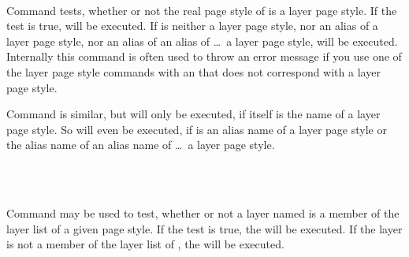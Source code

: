 \begin{Declaration}
  \\
\end{Declaration}
%
%
Command  tests, whether or not the real page
style of  is a layer page style. If the test is true,
 will be executed. If  is neither a
layer page style, nor an alias of a layer page style, nor an alias of an alias
of \dots\ a layer page style,  will be executed. Internally
this command is often used to throw an error message if you use one of the
layer page style commands with an  that does not
correspond with a layer page style.

Command  is similar, but 
will only be executed, if  itself is the name of a
layer page style. So  will even be executed, if  is an alias name of a layer page style or the alias name of an
alias name of \dots\ a layer page style.%
%
%

\begin{Declaration}
  \\
  \\
\end{Declaration}
%
%
%
Command  may be used to test, whether or not a layer
named  is a member of the layer list of a given page
style. If the test is true, the  will be executed. If the
layer is not a member of the layer list of , the
 will be executed.

